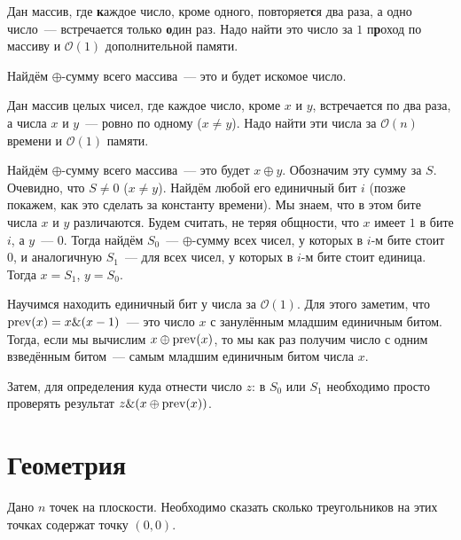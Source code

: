 \documentclass[addpoints]{exam}
\begin{document}
\begin{questions}
\begin{solution}
\end{solution}

\question[\half] Дан массив, где \textbf{к}аждое число, кроме одного, повторяет\textbf{с}я два раза, а одно число~--- встречается только \textbf{о}дин раз. Надо найти это число за $1$ п\textbf{р}оход по массиву и $\mathcal{O}(1)$ дополнительной памяти.

\begin{solution}

Найдём $\oplus$-сумму всего массива~--- это и будет искомое число.

\end{solution}

\question[1 \half] Дан массив целых чисел, где каждое число, кроме $x$ и $y$, встречается по два раза, а числа $x$ и $y$~--- ровно по одному ($x \neq y$). Надо найти эти числа за $\mathcal{O}(n)$ времени и $\mathcal{O}(1)$ памяти.

\begin{solution}

Найдём $\oplus$-сумму всего массива~--- это будет $x \oplus y$. Обозначим эту сумму за $S$. Очевидно, что $S \neq 0$ ($x \neq y$). Найдём любой его единичный бит $i$ (позже покажем, как это сделать за константу времени). Мы знаем, что в этом бите числа $x$ и $y$ различаются. Будем считать, не теряя общности, что $x$ имеет $1$ в бите $i$, а $y$~--- $0$. Тогда найдём $S_0$~--- $\oplus$-сумму всех чисел, у которых в $i$-м бите стоит $0$, и аналогичную $S_1$~--- для всех чисел, у которых в $i$-м бите стоит единица. Тогда $x = S_1$, $y = S_0$. 

Научимся находить единичный бит у числа за $\mathcal{O}(1)$. Для этого заметим, что $\operatorname{prev}(x) = x \& (x - 1)$~--- это число $x$ с занулённым младшим единичным битом. Тогда, если мы вычислим $x \oplus \operatorname{prev}(x)$, то мы как раз получим число с одним взведённым битом~--- самым младшим единичным битом числа $x$.

Затем, для определения куда отнести число $z$: в $S_0$ или $S_1$ необходимо просто проверять результат $z \& (x \oplus \operatorname{prev}(x))$.

\end{solution}


\section{Геометрия}

\question Дано $n$ точек на плоскости. Необходимо сказать сколько треугольников на этих точках содержат точку $(0,0)$. 


\end{questions}
\end{document}
